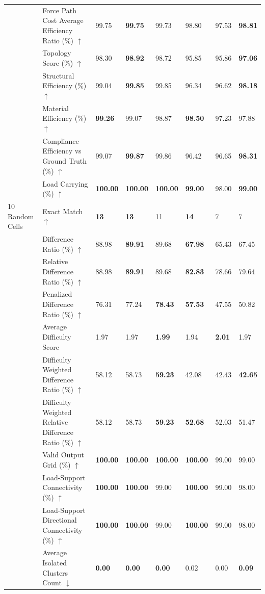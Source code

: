 \begin{table}[!h]
{\begin{tabular}{lllll|lll}
 & Force Path Cost Average Efficiency Ratio (\%) $\uparrow$ & 99.75 & \textbf{99.75} & 99.73 & 98.80 & 97.53 & \textbf{98.81} \\
 & Topology Score (\%) $\uparrow$ & 98.30 & \textbf{98.92} & 98.72 & 95.85 & 95.86 & \textbf{97.06} \\
 & Structural Efficiency (\%) $\uparrow$ & 99.04 & \textbf{99.85} & 99.85 & 96.34 & 96.62 & \textbf{98.18} \\
 & Material Efficiency (\%) $\uparrow$ & \textbf{99.26} & 99.07 & 98.87 & \textbf{98.50} & 97.23 & 97.88 \\
 & Compliance Efficiency vs Ground Truth (\%) $\uparrow$ & 99.07 & \textbf{99.87} & 99.86 & 96.42 & 96.65 & \textbf{98.31} \\
 & Load Carrying (\%) $\uparrow$ & \textbf{100.00} & \textbf{100.00} & \textbf{100.00} & \textbf{99.00} & 98.00 & \textbf{99.00} \\
\midrule
10 Random Cells & Exact Match $\uparrow$ & \textbf{13} & \textbf{13} & 11 & \textbf{14} & 7 & 7 \\
 & Difference Ratio (\%) $\uparrow$ & 88.98 & \textbf{89.91} & 89.68 & \textbf{67.98} & 65.43 & 67.45 \\
 & Relative Difference Ratio (\%) $\uparrow$ & 88.98 & \textbf{89.91} & 89.68 & \textbf{82.83} & 78.66 & 79.64 \\
 & Penalized Difference Ratio (\%) $\uparrow$ & 76.31 & 77.24 & \textbf{78.43} & \textbf{57.53} & 47.55 & 50.82 \\
 & Average Difficulty Score & 1.97 & 1.97 & \textbf{1.99} & 1.94 & \textbf{2.01} & 1.97 \\
 & Difficulty Weighted Difference Ratio (\%) $\uparrow$ & 58.12 & 58.73 & \textbf{59.23} & 42.08 & 42.43 & \textbf{42.65} \\
 & Difficulty Weighted Relative Difference Ratio (\%) $\uparrow$ & 58.12 & 58.73 & \textbf{59.23} & \textbf{52.68} & 52.03 & 51.47 \\
 & Valid Output Grid (\%) $\uparrow$ & \textbf{100.00} & \textbf{100.00} & \textbf{100.00} & \textbf{100.00} & 99.00 & 99.00 \\
 & Load-Support Connectivity (\%) $\uparrow$ & \textbf{100.00} & \textbf{100.00} & 99.00 & \textbf{100.00} & 99.00 & 98.00 \\
 & Load-Support Directional Connectivity (\%) $\uparrow$ & \textbf{100.00} & \textbf{100.00} & 99.00 & \textbf{100.00} & 99.00 & 98.00 \\
 & Average Isolated Clusters Count $\downarrow$ & \textbf{0.00} & \textbf{0.00} & \textbf{0.00} & 0.02 & 0.00 & \textbf{0.09} \\

\end{tabular}}
\end{table}

